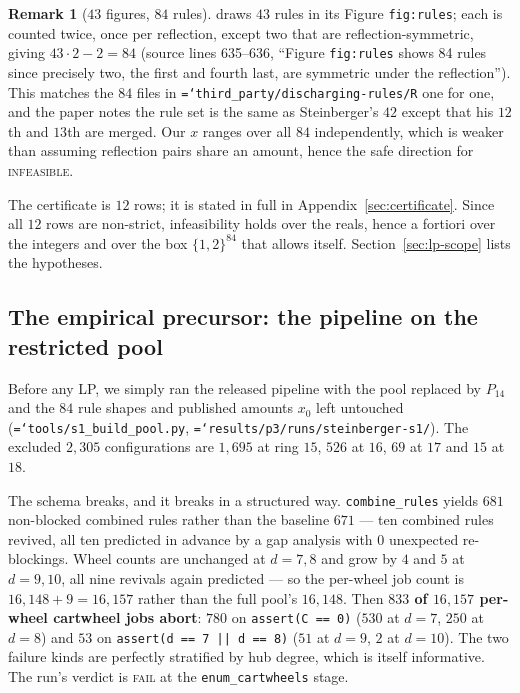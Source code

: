 \documentclass[11pt]{article}
\theoremstyle{definition}
\newtheorem{remark}[theorem]{Remark}
\newcommand{\art}[1]{{\texttt{\hyphenchar\font=`\-\relax #1}}}
\begin{document}
\begin{remark}[$43$ figures, $84$ rules]
\cite{nl4ct2026} draws $43$ rules in its Figure \texttt{fig:rules}; each is counted
twice, once per reflection, except two that are reflection-symmetric, giving
$43\cdot2-2 = 84$ (source lines 635--636, ``Figure \texttt{fig:rules} shows 84 rules
since precisely two, the first and fourth last, are symmetric under the
reflection''). This matches the $84$ files in
\art{third\_party/discharging-rules/R} one for one, and the paper notes the rule set
is the same as Steinberger's $42$ except that his $12$th and $13$th are merged. Our
$x$ ranges over all $84$ independently, which is weaker than assuming reflection
pairs share an amount, hence the safe direction for \textsc{infeasible}.
\end{remark}

The certificate is $12$ rows; it is stated in full in
Appendix~\ref{sec:certificate}. Since all $12$ rows are non-strict, infeasibility
holds over the reals, hence a fortiori over the integers and over the box
$\{1,2\}^{84}$ that \cite{nl4ct2026} allows itself. Section~\ref{sec:lp-scope}
lists the hypotheses.

\subsection{The empirical precursor: the pipeline on the restricted pool}
\label{sec:s1}

Before any LP, we simply ran the released pipeline with the pool replaced by
$P_{14}$ and the $84$ rule shapes and published amounts $x_0$ left untouched
(\art{tools/s1\_build\_pool.py}, \art{results/p3/runs/steinberger-s1/}). The
excluded $2{,}305$ configurations are $1{,}695$ at ring $15$, $526$ at $16$, $69$
at $17$ and $15$ at $18$.

The schema breaks, and it breaks in a structured way.
\texttt{combine\_rules} yields $681$ non-blocked combined rules rather than the
baseline $671$ --- ten combined rules revived, all ten predicted in advance by a
gap analysis with $0$ unexpected re-blockings. Wheel counts are unchanged at
$d=7,8$ and grow by $4$ and $5$ at $d=9,10$, all nine revivals again predicted ---
so the per-wheel job count is $16{,}148 + 9 = 16{,}157$ rather than the full pool's
$16{,}148$.
Then \textbf{$833$ of $16{,}157$ per-wheel cartwheel jobs abort}:
$780$ on \texttt{assert(C == 0)} ($530$ at $d=7$, $250$ at $d=8$) and $53$ on
\texttt{assert(d == 7 || d == 8)} ($51$ at $d=9$, $2$ at $d=10$). The two failure
kinds are perfectly stratified by hub degree, which is itself informative. The run's
verdict is \textsc{fail} at the \texttt{enum\_cartwheels} stage.
\end{document}
